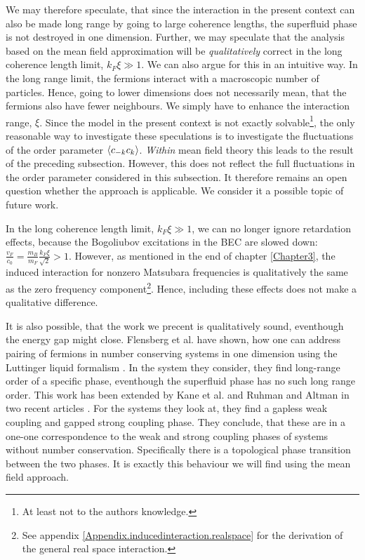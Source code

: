 We may therefore speculate, that since the interaction in the present context can also be made long range by going to large coherence lengths, the superfluid phase is not destroyed in one dimension. Further, we may speculate that the analysis based on the mean field approximation will be \textit{qualitatively} correct in the long coherence length limit, $k_F\xi \gg 1$. We can also argue for this in an intuitive way. In the long range limit, the fermions interact with a macroscopic number of particles. Hence, going to lower dimensions does not necessarily mean, that the fermions also have fewer neighbours. We simply have to enhance the interaction range, $\xi$. Since the model in the present context is not exactly solvable\footnote{At least not to the authors knowledge.}, the only reasonable way to investigate these speculations is to investigate the fluctuations of the order parameter $\braket{c_{-k}c_k}$. \textit{Within} mean field theory this leads to the result of the preceding subsection. However, this does not reflect the full fluctuations in the order parameter considered in this subsection. It therefore remains an open question whether the approach is applicable. We consider it a possible topic of future work. 

In the long coherence length limit, $k_F\xi \gg 1$, we can no longer ignore retardation effects, because the Bogoliubov excitations in the BEC are slowed down: $\frac{v_F}{c_0} = \frac{m_B}{m_F}\frac{k_F\xi}{\sqrt{2}} > 1$. However, as mentioned in the end of chapter \ref{Chapter3}, the induced interaction for nonzero Matsubara frequencies is qualitatively the same as the zero frequency component\footnote{See appendix \ref{Appendix.inducedinteraction.realspace} for the derivation of the general real space interaction.}. Hence, including these effects does not make a qualitative difference.

It is also possible, that the work we precent is qualitatively sound, eventhough the energy gap might close. Flensberg et al. have shown, how one can address pairing of fermions in number conserving systems in one dimension using the Luttinger liquid formalism \cite{Flensberg.numberconserving1Dfermions}. In the system they consider, they find long-range order of a specific phase, eventhough the superfluid phase has no such long range order. This work has been extended by Kane et al. and Ruhman and Altman in two recent articles \cite{Kane.Pairing.Luttingerliquids, Altman.Pairing.spinlessfermions}. For the systems they look at, they find a gapless weak coupling and gapped strong coupling phase. They conclude, that these are in a one-one correspondence to the weak and strong coupling phases of systems without number conservation. Specifically there is a topological phase transition between the two phases. It is exactly this behaviour we will find using the mean field approach.

